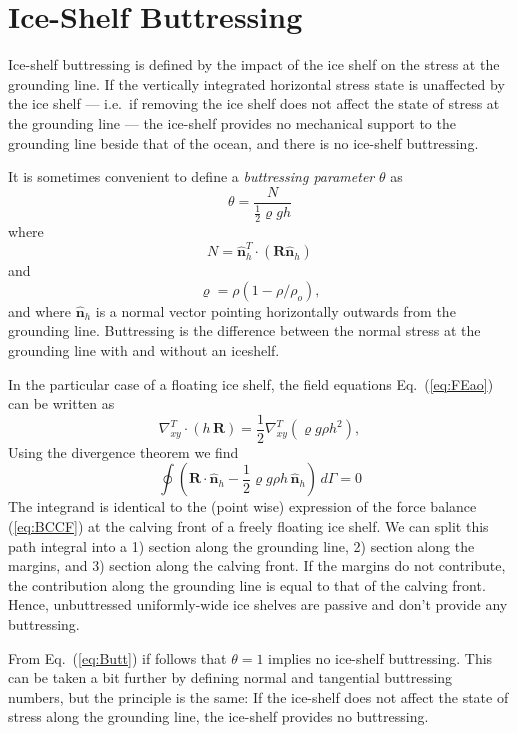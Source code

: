 \documentclass[10pt,a4paper]{book}
\newcommand{\normalh}{\hat{\bm{n}}_h}
\begin{document}
\section{Ice-Shelf Buttressing}

Ice-shelf buttressing is defined by the impact of the ice shelf on the
stress at the grounding line. If the vertically integrated horizontal
stress state is unaffected by the ice shelf --- i.e.\ if removing the
ice shelf does not affect the state of stress at the grounding line
--- the ice-shelf provides no mechanical support to the grounding line
beside that of the ocean, and there is no ice-shelf buttressing. 



It is sometimes convenient to define a {\em buttressing parameter} $\theta$  as
\[
\theta=\frac{N}{\frac{1}{2} \varrho g h}
\]
where
\begin{equation}
N=\normalh^T \cdot ( \bm{R} \normalh)
\end{equation}
and
\[
\varrho=\rho (1-\rho/\rho_o) ,
\]
and where $\normalh$ is a normal vector pointing horizontally outwards
from the grounding line. Buttressing is the difference between the
normal stress at the grounding line with and without an
iceshelf.

In the particular case of a floating ice shelf, the field equations Eq.~(\ref{eq:FEao}) can be written as
\[
\nabla_{xy}^T \cdot (h \, \bm{R}) = \frac{1}{2} \nabla_{xy}^T ( \varrho g \rho h^2 ),
\]
Using the divergence theorem we find 
\begin{equation}
\oint \! ( \bm{R}  \cdot  \normalh - \frac{1}{2}  \varrho g \rho h  \, \normalh) \, d \Gamma  = 0 
\label{eq:Butt}
\end{equation}
The integrand is identical to the (point wise) expression of the force
balance (\ref{eq:BCCF}) at the calving front of a freely floating ice
shelf. We can split this path integral into a 1) section along the
grounding line, 2) section along the margins, and 3) section along the
calving front. If the margins do not contribute, the contribution
along the grounding line is equal to that of the calving front. Hence,
unbuttressed uniformly-wide ice shelves are passive and don't provide any buttressing. 

From Eq.~(\ref{eq:Butt}) if follows that $\theta=1$ implies no
ice-shelf buttressing. This can be taken a bit further by defining
normal and tangential buttressing numbers, but the principle is the
same: If the ice-shelf does not affect the state of stress along the
grounding line, the ice-shelf provides no buttressing.
\end{document}
